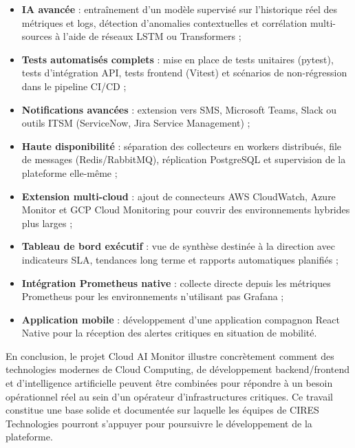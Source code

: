 \documentclass[11pt,a4paper]{report}
\begin{document}
\begin{itemize}
  \item \textbf{IA avancée} : entraînement d'un modèle supervisé sur
    l'historique réel des métriques et logs, détection d'anomalies
    contextuelles et corrélation multi-sources à l'aide de réseaux LSTM ou
    Transformers ;
  \item \textbf{Tests automatisés complets} : mise en place de tests
    unitaires (pytest), tests d'intégration API, tests frontend (Vitest) et
    scénarios de non-régression dans le pipeline CI/CD ;
  \item \textbf{Notifications avancées} : extension vers SMS, Microsoft
    Teams, Slack ou outils ITSM (ServiceNow, Jira Service Management) ;
  \item \textbf{Haute disponibilité} : séparation des collecteurs en workers
    distribués, file de messages (Redis/RabbitMQ), réplication PostgreSQL et
    supervision de la plateforme elle-même ;
  \item \textbf{Extension multi-cloud} : ajout de connecteurs AWS
    CloudWatch, Azure Monitor et GCP Cloud Monitoring pour couvrir des
    environnements hybrides plus larges ;
  \item \textbf{Tableau de bord exécutif} : vue de synthèse destinée à la
    direction avec indicateurs SLA, tendances long terme et rapports
    automatiques planifiés ;
  \item \textbf{Intégration Prometheus native} : collecte directe depuis
    les métriques Prometheus pour les environnements n'utilisant pas Grafana ;
  \item \textbf{Application mobile} : développement d'une application
    compagnon React Native pour la réception des alertes critiques en
    situation de mobilité.
\end{itemize}

\bigskip

En conclusion, le projet Cloud AI Monitor illustre concrètement comment des
technologies modernes de Cloud Computing, de développement backend/frontend
et d'intelligence artificielle peuvent être combinées pour répondre à un
besoin opérationnel réel au sein d'un opérateur d'infrastructures critiques.
Ce travail constitue une base solide et documentée sur laquelle les équipes
de CIRES Technologies pourront s'appuyer pour poursuivre le développement de
la plateforme.

\end{document}
